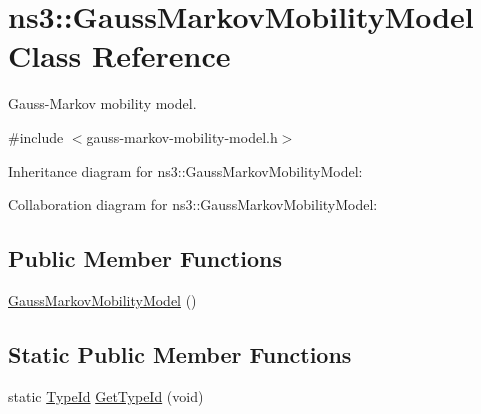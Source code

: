 \hypertarget{classns3_1_1GaussMarkovMobilityModel}{}\section{ns3\+:\+:Gauss\+Markov\+Mobility\+Model Class Reference}
\label{classns3_1_1GaussMarkovMobilityModel}


Gauss-\/\+Markov mobility model.  




{\ttfamily \#include $<$gauss-\/markov-\/mobility-\/model.\+h$>$}



Inheritance diagram for ns3\+:\+:Gauss\+Markov\+Mobility\+Model\+:


Collaboration diagram for ns3\+:\+:Gauss\+Markov\+Mobility\+Model\+:
\subsection*{Public Member Functions}
\begin{DoxyCompactItemize}
\item 
\hyperlink{classns3_1_1GaussMarkovMobilityModel_aa151f31da16245cc8bd7fd05e64a3cee}{Gauss\+Markov\+Mobility\+Model} ()
\end{DoxyCompactItemize}
\subsection*{Static Public Member Functions}
\begin{DoxyCompactItemize}
\item 
static \hyperlink{classns3_1_1TypeId}{Type\+Id} \hyperlink{classns3_1_1GaussMarkovMobilityModel_af62140b9303644cb04def54eb47ad5b0}{Get\+Type\+Id} (void)
\end{DoxyCompactItemize}

